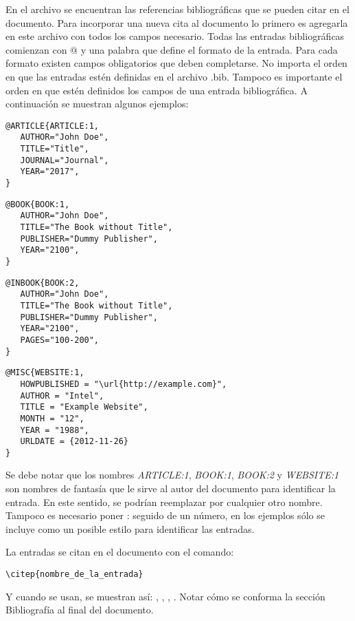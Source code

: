 En el archivo  se encuentran las referencias bibliográficas que se pueden citar en el documento.  Para incorporar una nueva cita al documento lo primero es agregarla en este archivo con todos los campos necesario.  Todas las entradas bibliográficas comienzan con $@$ y una palabra que define el formato de la entrada.  Para cada formato existen campos obligatorios que deben completarse. No importa el orden en que las entradas estén definidas en el archivo .bib.  Tampoco es importante el orden en que estén definidos los campos de una entrada bibliográfica. A continuación se muestran algunos ejemplos:

\begin{lstlisting}
@ARTICLE{ARTICLE:1,
   AUTHOR="John Doe",
   TITLE="Title",
   JOURNAL="Journal",
   YEAR="2017",
}
\end{lstlisting}


\begin{lstlisting}
@BOOK{BOOK:1,
   AUTHOR="John Doe",
   TITLE="The Book without Title",
   PUBLISHER="Dummy Publisher",
   YEAR="2100",
}
\end{lstlisting}


\begin{lstlisting}
@INBOOK{BOOK:2,
   AUTHOR="John Doe",
   TITLE="The Book without Title",
   PUBLISHER="Dummy Publisher",
   YEAR="2100",
   PAGES="100-200",
}
\end{lstlisting}


\begin{lstlisting}
@MISC{WEBSITE:1,
   HOWPUBLISHED = "\url{http://example.com}",
   AUTHOR = "Intel",
   TITLE = "Example Website",
   MONTH = "12",
   YEAR = "1988",
   URLDATE = {2012-11-26}
}
\end{lstlisting}

Se debe notar que los nombres \emph{ARTICLE:1}, \emph{BOOK:1}, \emph{BOOK:2} y \emph{WEBSITE:1} son nombres de fantasía que le sirve al autor del documento para identificar la entrada. En este sentido, se podrían reemplazar por cualquier otro nombre.  Tampoco es necesario poner : seguido de un número, en los ejemplos sólo se incluye como un posible estilo para identificar las entradas.

La entradas se citan en el documento con el comando: 

\begin{verbatim}
\citep{nombre_de_la_entrada}
\end{verbatim}

Y cuando se usan, se muestran así: \citep{ARTICLE:1}, \citep{BOOK:1}, \citep{BOOK:2}, \citep{WEBSITE:1}.  Notar cómo se conforma la sección Bibliografía al final del documento. 
